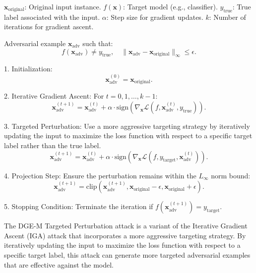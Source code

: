 $\mathbf{x}_{\text{original}}$: Original input instance.  
$f(\mathbf{x})$: Target model (e.g., classifier).  
$y_{\text{true}}$: True label associated with the input.  
$\alpha$: Step size for gradient updates.  
$k$: Number of iterations for gradient ascent.

Adversarial example $\mathbf{x}_{\text{adv}}$ such that:  
\[
f(\mathbf{x}_{\text{adv}}) \neq y_{\text{true}}, \quad \|\mathbf{x}_{\text{adv}} - \mathbf{x}_{\text{original}}\|_{\infty} \leq \epsilon.
\]

1. Initialization:  
   \[
   \mathbf{x}_{\text{adv}}^{(0)} = \mathbf{x}_{\text{original}}.
   \]

2. Iterative Gradient Ascent:  
   For $t = 0, 1, \dots, k-1$:  
   \[
   \mathbf{x}_{\text{adv}}^{(t+1)} = \mathbf{x}_{\text{adv}}^{(t)} + \alpha \cdot \text{sign}\left(\nabla_{\mathbf{x}} \mathcal{L}(f, \mathbf{x}_{\text{adv}}^{(t)}, y_{\text{true}})\right).
   \]

3. Targeted Perturbation:  
   Use a more aggressive targeting strategy by iteratively updating the input to maximize the loss function with respect to a specific target label rather than the true label.
   \[
   \mathbf{x}_{\text{adv}}^{(t+1)} = \mathbf{x}_{\text{adv}}^{(t)} + \alpha \cdot \text{sign}\left(\nabla_{\mathbf{x}} \mathcal{L}(f, y_{\text{target}}, \mathbf{x}_{\text{adv}}^{(t)})\right).
   \]

4. Projection Step: Ensure the perturbation remains within the $L_\infty$ norm bound:  
   \[
   \mathbf{x}_{\text{adv}}^{(t+1)} = \text{clip}\left(\mathbf{x}_{\text{adv}}^{(t+1)}, \mathbf{x}_{\text{original}} - \epsilon, \mathbf{x}_{\text{original}} + \epsilon\right).
   \]

5. Stopping Condition: Terminate the iteration if $f(\mathbf{x}_{\text{adv}}^{(t+1)}) = y_{\text{target}}$.

The DGE-M Targeted Perturbation attack is a variant of the Iterative Gradient Ascent (IGA) attack that incorporates a more aggressive targeting strategy. By iteratively updating the input to maximize the loss function with respect to a specific target label, this attack can generate more targeted adversarial examples that are effective against the model.